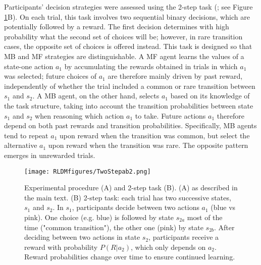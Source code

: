 \documentclass[11pt]{article} %
\begin{document}
Participants' decision strategies were assessed using the 2-step task (\cite{daw_model-based_2011}; see Figure \ref{TwoStep}B). On each trial, this task involves two sequential binary decisions, which are potentially followed by a reward. The first decision determines with high probability what the second set of choices will be; however, in rare transition cases, the opposite set of choices is offered instead. This task is designed so that MB and MF strategies are distinguishable. A MF agent learns the values of a state-one action $a_{1}$ by accumulating the rewards obtained in trials in which $a_{1}$ was selected; future choices of $a_{1}$ are therefore mainly driven by past reward, independently of whether the trial included a common or rare transition between $s_{1}$ and $s_{2}$. A MB agent, on the other hand, selects $a_{1}$ based on its knowledge of the task structure, taking into account the transition probabilities between state $s_{1}$ and $s_{2}$ when reasoning which action $a_{1}$ to take. Future actions $a_{1}$ therefore depend on both past rewards and transition probabilities. Specifically, MB agents tend to repeat $a_{1}$ upon reward when the transition was common, but select the alternative $a_{1}$ upon reward when the transition was rare. The opposite pattern emerges in unrewarded trials.
%
\begin{figure}
	\texttt{[image: RLDMfigures/TwoStepab2.png]}
	\caption{Experimental procedure (A) and 2-step task (B). (A) as described in the main text. (B) 2-step task: each trial has two successive states, $s_{1}$ and $s_{2}$. In $s_{1}$, participants decide between two actions $a_{1}$ (blue vs pink). One choice (e.g. blue) is followed by state $s_{2a}$ most of the time ("common transition"), the other one (pink) by state $s_{2b}$. After deciding between two actions in state $s_{2}$, participants receive a reward with probability $P(R|a_{2})$, which only depends on $a_{2}$. Reward probabilities change over time to ensure continued learning.}
	\label{TwoStep}
\end{figure}
%
\end{document}
